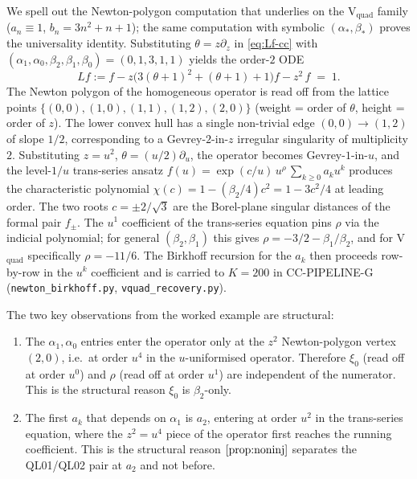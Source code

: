 \documentclass[11pt,reqno]{amsart}
\theoremstyle{plain}
\theoremstyle{definition}
\theoremstyle{remark}
\begin{document}
We spell out the Newton-polygon computation that underlies
 on the V$_\mathrm{quad}$ family
($a_n \equiv 1$, $b_n = 3 n^2 + n + 1$); the same computation
with symbolic $(\alpha_*, \beta_*)$ proves the universality
identity. Substituting $\theta = z\partial_z$ in
\eqref{eq:Lf-cc} with $(\alpha_1, \alpha_0, \beta_2, \beta_1,
\beta_0) = (0, 1, 3, 1, 1)$ yields the order-$2$ ODE
\[
  L f := f - z \bigl( 3(\theta+1)^2 + (\theta+1) + 1 \bigr) f
        - z^2 \, f \;=\; 1.
\]
The Newton polygon of the homogeneous operator is read off
from the lattice points
$\{(0, 0), (1, 0), (1, 1), (1, 2), (2, 0)\}$
(weight = order of $\theta$, height = order of $z$).
The lower convex hull has a single non-trivial edge
$(0, 0) \to (1, 2)$ of slope $1/2$, corresponding to a
Gevrey-$2$-in-$z$ irregular singularity of multiplicity $2$.
Substituting $z = u^2$, $\theta = (u/2)\partial_u$, the
operator becomes Gevrey-$1$-in-$u$, and the level-$1/u$
trans-series ansatz $f(u) = \exp(c/u)\,u^{\rho}\,\sum_{k \ge 0} a_k u^k$
produces the characteristic polynomial
$\chi(c) = 1 - (\beta_2/4) c^2 = 1 - 3 c^2 / 4$ at leading
order. The two roots $c = \pm 2/\sqrt{3}$ are the
Borel-plane singular distances of the formal pair $f_\pm$.
The $u^1$ coefficient of the trans-series equation pins
$\rho$ via the indicial polynomial; for general
$(\beta_2, \beta_1)$ this gives
$\rho = -3/2 - \beta_1/\beta_2$, and for V$_\mathrm{quad}$
specifically $\rho = -11/6$. The Birkhoff recursion for the
$a_k$ then proceeds row-by-row in the $u^k$ coefficient and
is carried to $K = 200$ in CC-PIPELINE-G
(\texttt{newton\_birkhoff.py}, \texttt{vquad\_recovery.py}).

The two key observations from the worked example are
structural:

\begin{enumerate}
\item The $\alpha_1, \alpha_0$ entries enter the operator
only at the $z^2$ Newton-polygon vertex $(2, 0)$, i.e.\ at
order $u^4$ in the $u$-uniformised operator. Therefore
$\xi_0$ (read off at order $u^0$) and $\rho$ (read off at
order $u^1$) are independent of the numerator. This is the
structural reason $\xi_0$ is $\beta_2$-only.
\item The first $a_k$ that depends on $\alpha_1$ is $a_2$,
entering at order $u^2$ in the trans-series equation, where
the $z^2 = u^4$ piece of the operator first reaches the
running coefficient. This is the structural reason
$\Cref{prop:noninj}$ separates the QL01/QL02 pair at $a_2$
and not before.
\end{enumerate}
\end{document}
